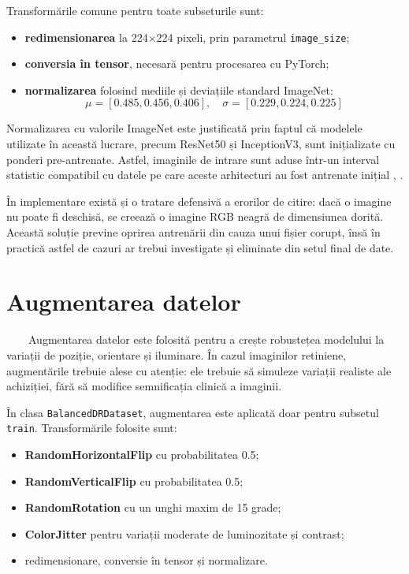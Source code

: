 \documentclass[12pt, a4paper, oneside, romanian]{teza-upb}
\begin{document}
Transformările comune pentru toate subseturile sunt:

\begin{itemize}
  \item \textbf{redimensionarea} la 224$\times$224 pixeli, prin parametrul \texttt{image\_size};
  \item \textbf{conversia în tensor}, necesară pentru procesarea cu PyTorch;
  \item \textbf{normalizarea} folosind mediile și deviațiile standard ImageNet:
        \[
        \mu = [0.485, 0.456, 0.406], \quad \sigma = [0.229, 0.224, 0.225]
        \]
\end{itemize}

Normalizarea cu valorile ImageNet este justificată prin faptul că modelele utilizate în această lucrare, precum ResNet50 și InceptionV3, sunt inițializate cu ponderi pre-antrenate. Astfel, imaginile de intrare sunt aduse într-un interval statistic compatibil cu datele pe care aceste arhitecturi au fost antrenate inițial \cite{21_he2016deep}, \cite{22_szegedy2016rethinking}.
\bigskip

În implementare există și o tratare defensivă a erorilor de citire: dacă o imagine nu poate fi deschisă, se creează o imagine RGB neagră de dimensiunea dorită. Această soluție previne oprirea antrenării din cauza unui fișier corupt, însă în practică astfel de cazuri ar trebui investigate și eliminate din setul final de date.

\section{Augmentarea datelor}

\ \ \ \ Augmentarea datelor este folosită pentru a crește robustețea modelului la variații de poziție, orientare și iluminare. În cazul imaginilor retiniene, augmentările trebuie alese cu atenție: ele trebuie să simuleze variații realiste ale achiziției, fără să modifice semnificația clinică a imaginii.
\bigskip

În clasa \texttt{BalancedDRDataset}, augmentarea este aplicată doar pentru subsetul \texttt{train}. Transformările folosite sunt:

\begin{itemize}
  \item \textbf{RandomHorizontalFlip} cu probabilitatea 0.5;
  \item \textbf{RandomVerticalFlip} cu probabilitatea 0.5;
  \item \textbf{RandomRotation} cu un unghi maxim de 15 grade;
  \item \textbf{ColorJitter} pentru variații moderate de luminozitate și contrast;
  \item redimensionare, conversie în tensor și normalizare.
\end{itemize}
\end{document}
